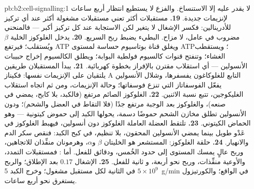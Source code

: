\begin{solution}{pb:b2:cell-signalling:1}
لا يقدر عليه إلا الاستنساخ. والفزع لا يستطيع انتظار أربع ساعات لإنزيمات
جديدة.
\textbf{19.} مستقبلات أكثر تعني مستقبلات مشغولة أكثر عند أي
تركيز للأدرينالين: فكسر الإشغال لا يتغير لكن
الاستجابة عند كل تركيز أكبر --- فالمنحني
مضروب في عامل، لا مزاح.  البطيء يضبط ربح السريع.
\textbf{20.} يدخل الغلوكوز الخلية $\beta$ ويُستقلب؛ فيرتفع ATP
ويغلق قناة بوتاسيوم حساسة لمستوى ATP؛ ويستقطب الغشاء؛
وتنفتح قنوات كالسيوم فولطية البوابة؛ ويطلق الكالسيوم
إخراج حبيبات الأنسولين --- أي استقلاب مقترن
بالإفراز بخطوة كهربائية.
\textbf{21.} يبدأ المستقبلان طريقين يلتقيان على
الإنزيمات نفسها: فكيناز A التابع للغلوكاغون يفسفرها، وشلال الأنسولين
يفعّل الفوسفاتاز التي تنزع فوسفاتها؛ وحالة
الإنزيمات، ومن ثم اتجاه استقلاب الغليكوجين، تتبع
نسبة الاثنين.
\textbf{22.} الغلوكوز الصائم مرتفع (فالكبد، بلا كابح، يمضي
في صنعه)، والغلوكوز بعد الوجبة مرتفع جدًا (فلا التقاط في العضل
والشحم)؛ ودون الأنسولين تطلق مخازن الشحم حموضًا دسمة، يحولها
الكبد إلى حموض كيتونية --- وهو الحماض الكيتوني.
\textbf{23.} تلتقط العضلة العاملة الغلوكوز دون أنسولين، فيهبط
الغلوكوز في عَدْو طويل بينما يمضي الأنسولين المحقون، بلا تنظيم،
في كبح الكبد: فنقص سكر الدم والانهيار.
\textbf{24.} حلقة الغلوكوز: المستشعر هو الخليتان $\beta$ و$\alpha$،
وهرمونان منفِّذان للاتجاهين، وربح عالٍ يمسك
المستوى إلى حدود الخُمس، ودقائق للفعل. أما : فمستقبلات
التمدد،  والأوعية منفِّذات، وربح نحو أربعة، و
ثانية للفعل.
\textbf{25.} الإشغال $0.17$ بعد الإطلاق؛ والربح $5\times 10^{9}$ في الثانية
لكل مستقبل مشغول؛ وخرج الكبد \qty{5}{g/min} في الواقع؛ والكورتيزول
يستغرق نحو أربع ساعات.
\end{solution}
